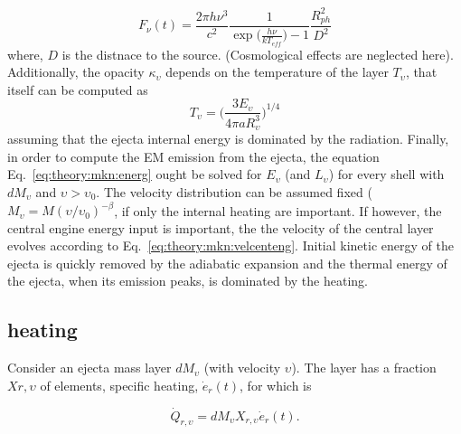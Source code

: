 %
\begin{equation}
F_{\nu}(t) = \frac{2\pi h \nu^3}{c^2} \frac{1}{\exp\Big(\frac{h\nu}{kT_{eff}}\Big) - 1} \frac{R_{ph}^2}{D^2}
\end{equation}
%
where, $D$ is the distnace to the source. (Cosmological effects are neglected here).
%
Additionally, the opacity $\kappa_{\upsilon}$ depends on the temperature of the 
layer $T_{\upsilon}$, that itself can be computed as 
%
\begin{equation}
T_{\upsilon} = \Bigg(\frac{3E_{\upsilon}}{4\pi a R^{3}_{\upsilon}}\Bigg)^{1/4}
\end{equation}
%
assuming that the ejecta internal energy is dominated by the radiation. 
%
Finally, in order to compute the \ac{EM} emission from the ejecta, 
the equation Eq.~\eqref{eq:theory:mkn:energ} ought be solved for $E_{\upsilon}$ (and $L_{\upsilon}$) 
for every shell with $dM_{\upsilon}$ and $\upsilon>\upsilon_0$. 
%
The velocity distribution can be assumed fixed (\eg $M_{\upsilon} = M(\upsilon/\upsilon_0)^{-\beta}$,  
if only the internal heating are important. If however, the central engine energy input is important, 
the the velocity of the central layer evolves according to Eq.~\eqref{eq:theory:mkn:velcenteng}.
%
Initial kinetic energy of the ejecta is quickly removed by the adiabatic expansion and the 
thermal energy of the ejecta, when its emission peaks, is dominated by the heating.


\subsection{\rproc{} heating}
%
Consider an ejecta mass layer $dM_{\upsilon}$ (with velocity $\upsilon$).
The layer has a fraction $X{r,\upsilon}$ of \rproc{} elements, specific heating, $\dot{e}_r(t)$,  for which is 

\begin{equation}
\dot{Q}_{r,\upsilon} = dM_{\upsilon}X_{r,\upsilon}\dot{e}_{r}(t).
\end{equation}

